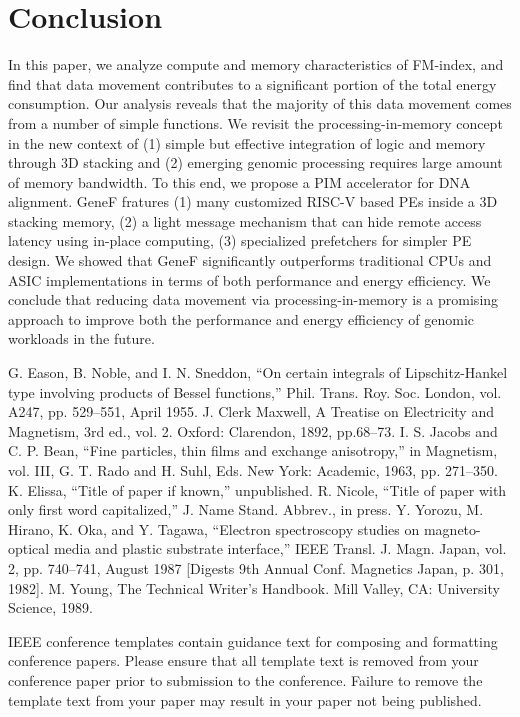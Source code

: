 \documentclass[9pt,conference]{IEEEtran}
\begin{document}
\section{Conclusion}
In this paper, we analyze compute and memory characteristics of FM-index, and find that data movement contributes to a significant portion of the total energy consumption. Our analysis reveals that the majority of this data movement comes from a number of simple functions. We revisit the processing-in-memory concept in the new context of (1) simple but effective integration of logic and memory through 3D stacking and (2) emerging genomic processing requires large amount of memory bandwidth. To this end, we propose a PIM accelerator for DNA alignment. GeneF fratures (1) many customized RISC-V based PEs inside a 3D stacking memory, (2) a light message mechanism that can hide remote access latency using in-place computing, (3) specialized prefetchers for simpler PE design. We showed that GeneF significantly outperforms traditional CPUs and ASIC implementations in terms of both performance and energy efficiency. We conclude that reducing data movement via processing-in-memory is a promising approach to improve both the performance and energy efficiency of genomic workloads in the future.















\begin{thebibliography}{00}
 G. Eason, B. Noble, and I. N. Sneddon, ``On certain integrals of Lipschitz-Hankel type involving products of Bessel functions,'' Phil. Trans. Roy. Soc. London, vol. A247, pp. 529--551, April 1955.
 J. Clerk Maxwell, A Treatise on Electricity and Magnetism, 3rd ed., vol. 2. Oxford: Clarendon, 1892, pp.68--73.
 I. S. Jacobs and C. P. Bean, ``Fine particles, thin films and exchange anisotropy,'' in Magnetism, vol. III, G. T. Rado and H. Suhl, Eds. New York: Academic, 1963, pp. 271--350.
 K. Elissa, ``Title of paper if known,'' unpublished.
 R. Nicole, ``Title of paper with only first word capitalized,'' J. Name Stand. Abbrev., in press.
 Y. Yorozu, M. Hirano, K. Oka, and Y. Tagawa, ``Electron spectroscopy studies on magneto-optical media and plastic substrate interface,'' IEEE Transl. J. Magn. Japan, vol. 2, pp. 740--741, August 1987 [Digests 9th Annual Conf. Magnetics Japan, p. 301, 1982].
 M. Young, The Technical Writer's Handbook. Mill Valley, CA: University Science, 1989.
\end{thebibliography}
\vspace{12pt}
\color{red}
IEEE conference templates contain guidance text for composing and formatting conference papers. Please ensure that all template text is removed from your conference paper prior to submission to the conference. Failure to remove the template text from your paper may result in your paper not being published.
\end{document}
